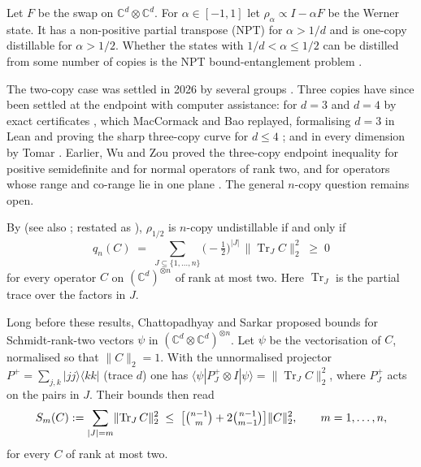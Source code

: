 \documentclass[11pt]{article}
\theoremstyle{remark}
\newcommand{\Tr}{\operatorname{Tr}}
\newcommand{\norm}[1]{\lVert #1\rVert}
\begin{document}
Let $F$ be the swap on $\mathbb C^d\otimes\mathbb C^d$. For $\alpha\in[-1,1]$ let $\rho_\alpha\propto I-\alpha F$ be the
Werner state. It has a non-positive partial transpose (NPT) for $\alpha>1/d$ and is one-copy distillable for
$\alpha>1/2$. Whether the states with $1/d<\alpha\le1/2$ can be distilled from some number of copies is the NPT
bound-entanglement problem \cite{DSSTT,DCLB,HRZ}.

The two-copy case was settled in 2026 by several groups \cite{FGP,SongChen,FHPV,BGH}. Three copies have since been
settled at the endpoint with computer assistance: for $d=3$ and $d=4$ by exact certificates \cite{AnonD3,LiuD4}, which MacCormack and Bao replayed, formalising $d=3$ in Lean and proving the sharp three-copy curve for $d\le4$ \cite{MB}; and in every dimension by Tomar \cite{Tomar}. Earlier, Wu and Zou proved the three-copy
endpoint inequality for positive semidefinite and for normal operators of rank two, and for operators whose range and
co-range lie in one plane \cite{WuZou}. The general $n$-copy
question remains open.

By \cite[Thm.~1]{CR23} (see also \cite[Thm.~V.1]{QGWG}; restated as \cite[Thm.~1]{SongChen}), $\rho_{1/2}$ is $n$-copy undistillable if and only if
\begin{equation}\label{eq:qn}
q_n(C)\;=\;\sum_{J\subseteq\{1,\dots,n\}}\Big(-\tfrac12\Big)^{|J|}\,\norm{\Tr_J C}_2^2\;\ge\;0
\end{equation}
for every operator $C$ on $(\mathbb C^d)^{\otimes n}$ of rank at most two. Here $\Tr_J$ is the partial trace over the
factors in $J$.

Long before these results, Chattopadhyay and Sarkar \cite{CS} proposed bounds for Schmidt-rank-two vectors $\psi$ in
$(\mathbb C^d\otimes\mathbb C^d)^{\otimes n}$. Let $\psi$ be the vectorisation of $C$, normalised so that
$\norm{C}_2=1$. With the unnormalised projector $P^+=\sum_{j,k}|jj\rangle\langle kk|$ (trace $d$) one has
$\langle\psi|P^+_J\otimes I|\psi\rangle=\norm{\Tr_JC}_2^2$, where $P^+_J$ acts on the pairs in $J$. Their bounds then read
\begin{equation}\label{eq:CS}
S_m(C):=\sum_{|J|=m}\norm{\Tr_JC}_2^2\;\le\;\big[\tbinom{n-1}{m}+2\tbinom{n-1}{m-1}\big]\norm{C}_2^2,\qquad m=1,\dots,n,
\end{equation}
for every $C$ of rank at most two.
\end{document}
